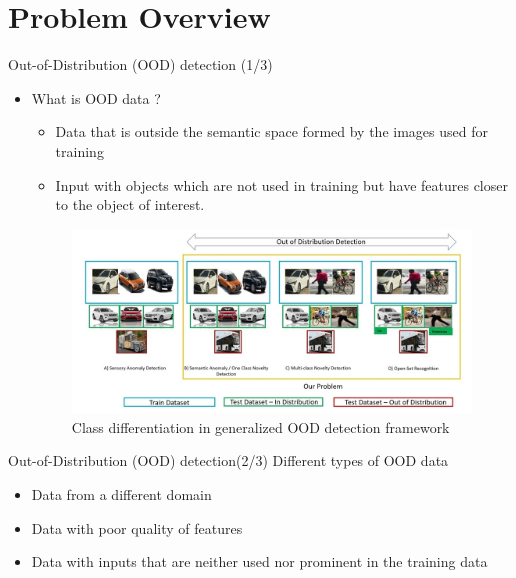 \documentclass[10pt, aspectratio=169]{beamer}
\begin{document}
\section{Problem Overview}
\begin{frame}{Out-of-Distribution (OOD) detection (1/3)}
    \begin{itemize}
        \item What is OOD data ?
        \begin{itemize}
            \item Data that is outside the semantic space formed by the images used for training
            \item Input with objects which are not used in training but have features closer to the object of
            interest.
        \end{itemize}
        
        \begin{figure}
            \centering
            \includegraphics[scale=0.2]{images/OOD_vs_Non-OOD.jpg}
            \caption[\acrlong{ood} detection problem setting]{Class differentiation in generalized OOD detection framework}
            \label{fig:OOD_classes}
        \end{figure}
    \end{itemize}
\end{frame}

\begin{frame}{Out-of-Distribution (OOD) detection(2/3)}
    Different types of OOD data
    \begin{itemize}
        \item Data from a different domain
        \item Data with poor quality of features
        \item Data with inputs that are neither used nor prominent in the training data
    \end{itemize}
\end{frame}
\end{document}

